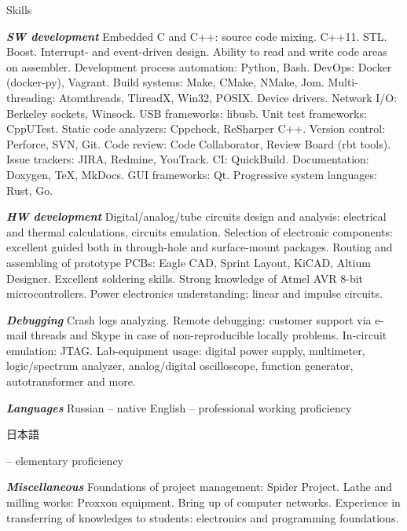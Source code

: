 \documentclass{template}
\begin{document}
\begin{rSection}{Skills}
\begin{rItemize}
\item \textbf{\textit{SW development}} \newline Embedded C and C++: source code mixing. C++11. STL. Boost. Interrupt- and event-driven design. Ability to read and write code areas on assembler. Development process automation: Python, Bash. DevOps: Docker (docker-py), Vagrant. Build systems: Make, CMake, NMake, Jom. Multi-threading: Atomthreads, ThreadX, Win32, POSIX. Device drivers. Network I/O: Berkeley sockets, Winsock. USB frameworks: libusb. Unit test frameworks: CppUTest. Static code analyzers: Cppcheck, ReSharper C++. Version control: Perforce, SVN, Git. Code review: Code Collaborator, Review Board (rbt tools). Issue trackers: JIRA, Redmine, YouTrack. CI: QuickBuild. Documentation: Doxygen, \TeX, MkDocs. GUI frameworks: Qt. Progressive system languages: Rust, Go.
\item \textbf{\textit{HW development}} \newline Digital/analog/tube circuits design and analysis: electrical and thermal calculations, circuits emulation. Selection of electronic components: excellent guided both in through-hole and surface-mount packages. Routing and assembling of prototype PCBs: Eagle CAD, Sprint Layout, KiCAD, Altium Designer. Excellent soldering skills. Strong knowledge of Atmel AVR 8-bit microcontrollers. Power electronics understanding: linear and impulse circuits.
\item \textbf{\textit{Debugging}} \newline Crash logs analyzing. Remote debugging: customer support via e-mail threads and Skype in case of non-reproducible locally problems. In-circuit emulation: JTAG. Lab-equipment usage: digital power supply, multimeter, logic/spectrum analyzer, analog/digital oscilloscope, function generator, autotransformer and more.
\item \textbf{\textit{Languages}} \newline Russian -- native \newline English -- professional working proficiency \newline \begin{CJK}{UTF8}{min}日本語\end{CJK} -- elementary proficiency
\item \textbf{\textit{Miscellaneous}} \newline Foundations of project management: Spider Project. Lathe and milling works: Proxxon equipment. Bring up of computer networks. Experience in transferring of knowledges to students: electronics and programming foundations.
\end{rItemize}
\end{rSection}
\end{document}
